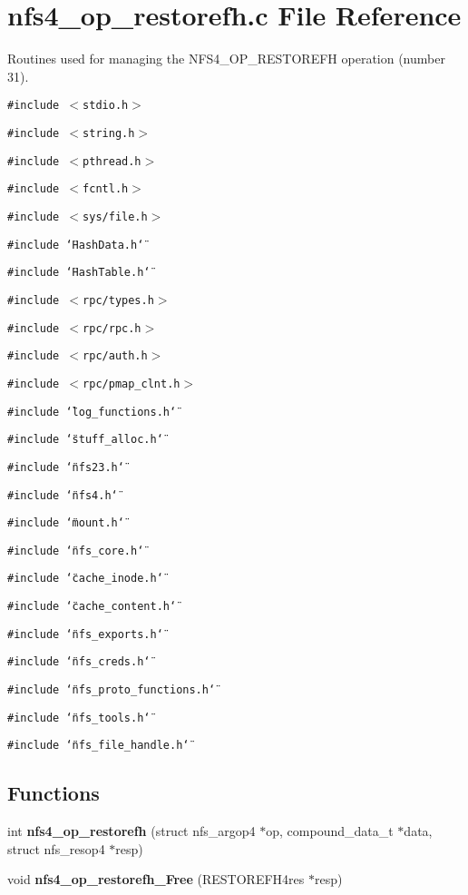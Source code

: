 \section{nfs4\_\-op\_\-restorefh.c File Reference}
\label{nfs4__op__restorefh_8c}
Routines used for managing the NFS4\_\-OP\_\-RESTOREFH operation (number 31). 

{\tt \#include $<$stdio.h$>$}\par
{\tt \#include $<$string.h$>$}\par
{\tt \#include $<$pthread.h$>$}\par
{\tt \#include $<$fcntl.h$>$}\par
{\tt \#include $<$sys/file.h$>$}\par
{\tt \#include \char`\"{}Hash\-Data.h\char`\"{}}\par
{\tt \#include \char`\"{}Hash\-Table.h\char`\"{}}\par
{\tt \#include $<$rpc/types.h$>$}\par
{\tt \#include $<$rpc/rpc.h$>$}\par
{\tt \#include $<$rpc/auth.h$>$}\par
{\tt \#include $<$rpc/pmap\_\-clnt.h$>$}\par
{\tt \#include \char`\"{}log\_\-functions.h\char`\"{}}\par
{\tt \#include \char`\"{}stuff\_\-alloc.h\char`\"{}}\par
{\tt \#include \char`\"{}nfs23.h\char`\"{}}\par
{\tt \#include \char`\"{}nfs4.h\char`\"{}}\par
{\tt \#include \char`\"{}mount.h\char`\"{}}\par
{\tt \#include \char`\"{}nfs\_\-core.h\char`\"{}}\par
{\tt \#include \char`\"{}cache\_\-inode.h\char`\"{}}\par
{\tt \#include \char`\"{}cache\_\-content.h\char`\"{}}\par
{\tt \#include \char`\"{}nfs\_\-exports.h\char`\"{}}\par
{\tt \#include \char`\"{}nfs\_\-creds.h\char`\"{}}\par
{\tt \#include \char`\"{}nfs\_\-proto\_\-functions.h\char`\"{}}\par
{\tt \#include \char`\"{}nfs\_\-tools.h\char`\"{}}\par
{\tt \#include \char`\"{}nfs\_\-file\_\-handle.h\char`\"{}}\par
\subsection*{Functions}
\begin{CompactItemize}
\item 
int {\bf nfs4\_\-op\_\-restorefh} (struct nfs\_\-argop4 $\ast$op, compound\_\-data\_\-t $\ast$data, struct nfs\_\-resop4 $\ast$resp)
\item 
void {\bf nfs4\_\-op\_\-restorefh\_\-Free} (RESTOREFH4res $\ast$resp)
\end{CompactItemize}


